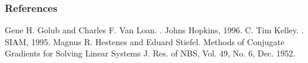 \documentclass[mathserif,handout]{beamer} %
\begin{document}
\begin{frame}[allowframebreaks]
  \frametitle<presentation>{References}    
  \begin{thebibliography}{10}    
  \beamertemplatebookbibitems
   Gene H. Golub and Charles F. Van Loan.
    .
   \newblock Johns Hopkins, 1996.
    \beamertemplatearticlebibitems
  \beamertemplatebookbibitems
   C. Tim Kelley.
    .
   \newblock SIAM, 1995.
     \beamertemplatearticlebibitems
 Magnus R. Hestenes and Eduard Stiefel.
  \newblock Methods of Conjugate Gradients for Solving Linear Systems
 \newblock J. Res. of NBS, Vol. 49, No. 6, Dec. 1952.
 \end{thebibliography}

\end{frame}%
\end{document}

